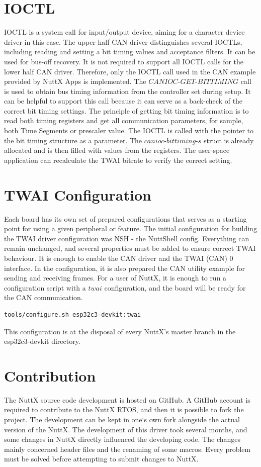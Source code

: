 \documentclass{ctuthesis}
\begin{document}
 \section{IOCTL}
 IOCTL is a system call for input/output device, aiming for a character device driver in this case. The upper half CAN driver distinguishes several IOCTLs, including reading and setting a bit timing values and acceptance filters. It can be used for bus-off recovery. It is not required to support all IOCTL calls for the lower half CAN driver. Therefore, only the IOCTL call used in the CAN example provided by NuttX Apps is implemented. The $CANIOC\text{-}GET\text{-}BITTIMING$ call is used to obtain bus timing information from the controller set during setup. It can be helpful to support this call because it can serve as a back-check of the correct bit timing settings.
 The principle of getting bit timing information is to read both timing registers and get all communication parameters, for sample, both Time Segments or prescaler value. The IOCTL is called with the pointer to the bit timing structure as a parameter.
 The $canioc\text{-}bittiming\text{-}s$ struct is already allocated and is then filled with values from the registers. The user-space application can recalculate the TWAI bitrate to verify the correct setting.
 
 \section{TWAI Configuration}
 Each board has its own set of prepared configurations that serves as a starting point for using a given peripheral or feature. The initial configuration for building the TWAI driver configuration was NSH - the NuttShell config. Everything can remain unchanged, and several properties must be added to ensure correct TWAI behaviour. It is enough to enable the CAN driver and the TWAI (CAN) 0 interface. In the configuration, it is also prepared the CAN utility example for sending and receiving frames. For a user of NuttX, it is enough to run a configuration script with a $twai$ configuration, and the board will be ready for the CAN communication.
\begin{verbatim}
tools/configure.sh esp32c3-devkit:twai
\end{verbatim}
This configuration is at the disposal of every NuttX's master branch in the esp32c3-devkit directory. 
 
 \section{Contribution}
 The NuttX source code development is hosted on GitHub. A GitHub account is required to contribute to the NuttX RTOS, and then it is possible to fork the project\cite{twai-branch}. The development can be kept in one‘s own fork alongside the actual version of the NuttX. The development of this driver took several months, and some changes in NuttX directly influenced the developing code. The changes mainly concerned header files and the renaming of some macros. Every problem must be solved before attempting to submit changes to NuttX.
 
\end{document}
